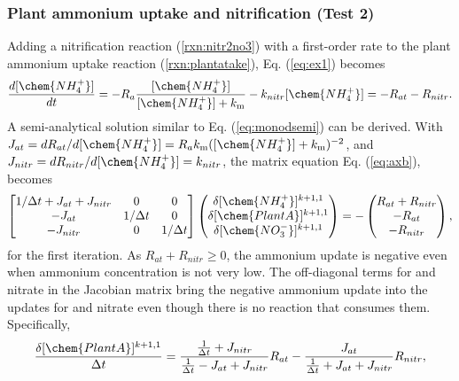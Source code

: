 \documentclass[gmd, manuscript]{copernicus}
\begin{document}
\subsubsection{Plant ammonium uptake and nitrification (Test 2)}

Adding a nitrification reaction (\ref{rxn:nitr2no3}) with a first-order rate to
the plant ammonium uptake reaction (\ref{rxn:plantatake}),
Eq. (\ref{eq:ex1}) becomes
\begin{equation}
\frac{d[\chem{NH_4^+}]}{dt} =- R_a
\frac{[\chem{NH_4^+}]}{[\chem{NH_4^+}]+k_\text{m}}
- k_{nitr} [\chem{NH_4^+}] = -R_{at} - R_{nitr}.
\label{eq:ex2}
\end{equation}
A semi-analytical solution similar to Eq. (\ref{eq:monodsemi}) can be derived. With $J_{at} =
dR_{at}/d[\chem{NH_4^+}] = R_ak_\text{m}([\chem{NH_4^+}] +
k_\text{m})^{-2}$, and $J_{nitr} = dR_{nitr}/d[\chem{NH_4^+}]=k_{nitr}$,
the matrix
equation Eq. (\ref{eq:axb}), becomes 
\begin{equation}
\left[
\begin{matrix}
1/\Delta t + J_{at} + J_{nitr} & 0 & 0 \\
-J_{at} & 1/\Delta t & 0 \\
-J_{nitr} & 0 & 1/\Delta t \\
\end{matrix}
\right]
\left(
\begin{matrix}
\delta [\chem{NH_4^+}]^{k+1,1} \\
\delta [\chem{PlantA}]^{k+1,1} \\
\delta [\chem{NO_3^-}]^{k+1,1} 
\end{matrix}
\right)
=-
\left(
\begin{matrix}
R_{at} + R_{nitr} \\
-R_{at} \\
-R_{nitr} 
\end{matrix}
\right),
\label{eq:test2}
\end{equation}
for the first iteration. As $R_{at} + R_{nitr} \geq 0$, the ammonium update is
negative even when ammonium concentration is not very low. 
The off-diagonal terms for  and nitrate in the Jacobian matrix
bring the negative ammonium update into the updates for  and
nitrate even though there is no reaction that consumes them. Specifically, 
\begin{equation}
\frac{\delta [\chem{PlantA}]^{k+1,1}}{\Delta t} 
= \frac{\frac{1}{\Delta t} + J_{nitr}}{\frac{1}{\Delta t} - J_{at} + J_{nitr}}
R_{at} - \frac{J_{at} }{\frac{1}{\Delta t} + J_{at} + J_{nitr}} R_{nitr},
\end{equation}
\end{document}
